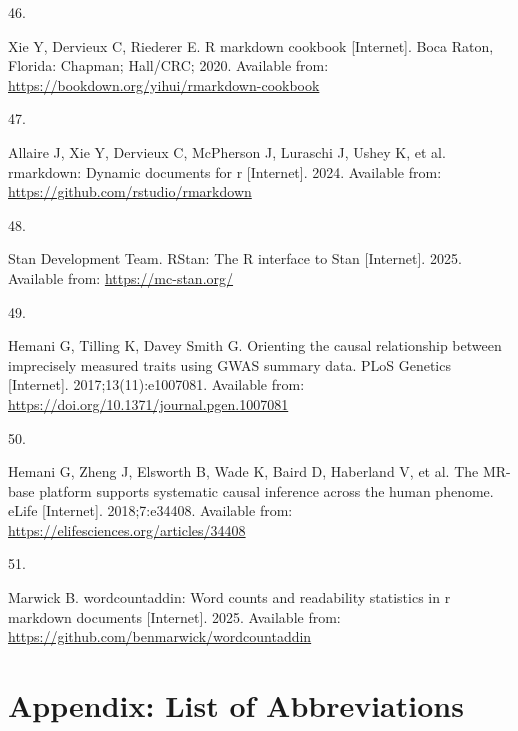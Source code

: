 \documentclass[
]{article}
\newlength{\cslhangindent}
\newlength{\csllabelwidth}
\newenvironment{CSLReferences}[2] %
 {\begin{list}{}{%
  \setlength{\itemindent}{0pt}
  \setlength{\leftmargin}{0pt}
  \setlength{\parsep}{0pt}
  \ifodd #1
   \setlength{\leftmargin}{\cslhangindent}
   \setlength{\itemindent}{-1\cslhangindent}
  \fi
  \setlength{\itemsep}{#2\baselineskip}}}
 {\end{list}}
\newcommand{\CSLLeftMargin}[1]{\parbox[t]{\csllabelwidth}{\strut#1\strut}}
\newcommand{\CSLRightInline}[1]{\parbox[t]{\linewidth - \csllabelwidth}{\strut#1\strut}}
\begin{document}
\begin{CSLReferences}{0}{1}
\CSLLeftMargin{46. }%
\CSLRightInline{Xie Y, Dervieux C, Riederer E. R markdown cookbook {[}Internet{]}. Boca Raton, Florida: Chapman; Hall/CRC; 2020. Available from: \url{https://bookdown.org/yihui/rmarkdown-cookbook}}

\CSLLeftMargin{47. }%
\CSLRightInline{Allaire J, Xie Y, Dervieux C, McPherson J, Luraschi J, Ushey K, et al. {rmarkdown}: Dynamic documents for r {[}Internet{]}. 2024. Available from: \url{https://github.com/rstudio/rmarkdown}}

\CSLLeftMargin{48. }%
\CSLRightInline{Stan Development Team. {RStan}: The {R} interface to {Stan} {[}Internet{]}. 2025. Available from: \url{https://mc-stan.org/}}

\CSLLeftMargin{49. }%
\CSLRightInline{Hemani G, Tilling K, Davey Smith G. Orienting the causal relationship between imprecisely measured traits using GWAS summary data. PLoS Genetics {[}Internet{]}. 2017;13(11):e1007081. Available from: \url{https://doi.org/10.1371/journal.pgen.1007081}}

\CSLLeftMargin{50. }%
\CSLRightInline{Hemani G, Zheng J, Elsworth B, Wade K, Baird D, Haberland V, et al. The MR-base platform supports systematic causal inference across the human phenome. eLife {[}Internet{]}. 2018;7:e34408. Available from: \url{https://elifesciences.org/articles/34408}}

\CSLLeftMargin{51. }%
\CSLRightInline{Marwick B. {wordcountaddin}: Word counts and readability statistics in r markdown documents {[}Internet{]}. 2025. Available from: \url{https://github.com/benmarwick/wordcountaddin}}

\end{CSLReferences}

\newpage

\appendix


\newpage

\section{Appendix: List of Abbreviations}\label{appendix-acr}
\end{document}
